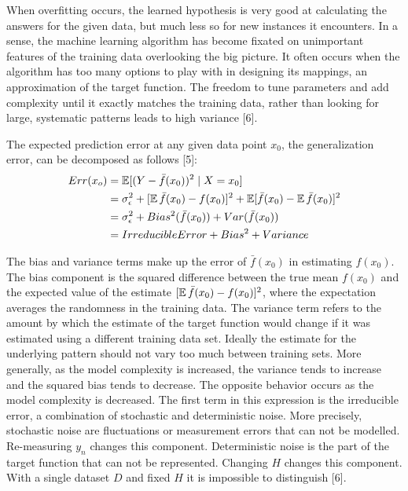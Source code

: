 When overfitting occurs, the learned hypothesis is very good at calculating the answers for the given data, but much less so for new instances it encounters. In a sense, the machine learning algorithm has become ﬁxated on unimportant features of the training data overlooking the big picture. It often occurs when the algorithm has too many options to play with in designing its mappings, an approximation of the target function. The freedom to tune parameters and add complexity until it exactly matches the training data, rather than looking for large, systematic patterns leads to high variance [6].

The expected prediction error at any given data point \(x_0\), the generalization error, can be decomposed as follows [5]: 
\begin{align*}
Err(x_o) &= \operatorname{\mathbb{E}}[(Y - \bar{f}(x_0))^2 \mid X = x_0] \\
& =  \sigma^2_\epsilon + [\operatorname{\mathbb{E}}\bar{f}(x_0) - f(x_0)]^2 + \operatorname{\mathbb{E}}[\bar{f}(x_0) - \operatorname{\mathbb{E}}\bar{f}(x_0)]^2\\
& =  \sigma^2_\epsilon + Bias^2(\bar{f}(x_0)) + Var(\bar{f}(x_0)) \\
& = Irreducible Error + Bias^2 + Variance
\end{align*}

The bias and variance terms make up the error of \(\bar{f}(x_0)\) in estimating \(f(x_0)\). The bias component is the squared difference between the true mean \(f(x_0)\) and the expected value of the estimate \([\operatorname{\mathbb{E}}\bar{f}(x_0) - f(x_0)]^2\), where the expectation averages the randomness in the training data. The variance term refers to the amount by which the estimate of the target function would change if it was estimated using a different training data set. Ideally the estimate for the underlying pattern should not vary too much between training sets. More generally, as the model complexity is increased, the variance tends to increase and the squared bias tends to decrease. The opposite behavior occurs as the model complexity is decreased. The first term in this expression is the irreducible error, a combination of stochastic and deterministic noise. More precisely, stochastic noise are fluctuations or measurement errors that can not be modelled. Re-measuring \(y_n\) changes this component. Deterministic noise is the part of the target function that can not be represented. Changing \(H\) changes this component. With a single dataset \(D\) and fixed \(H\) it is impossible to distinguish [6].  